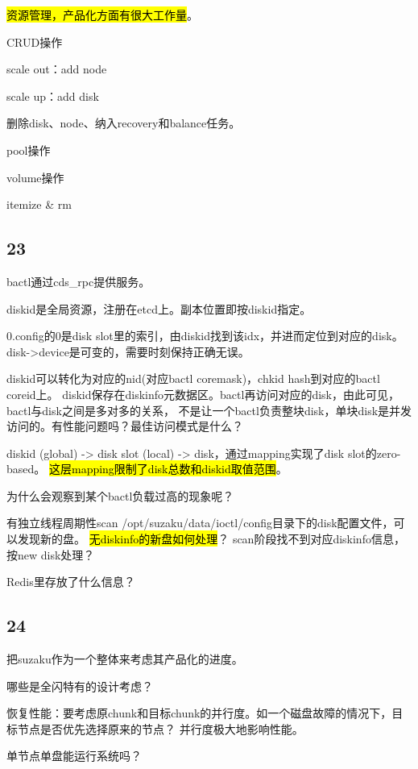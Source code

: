 \hrulefill

\hl{资源管理，产品化方面有很大工作量}。

CRUD操作

scale out：add node

scale up：add disk

删除disk、node、纳入recovery和balance任务。

pool操作

volume操作
\begin{myeasylist}{itemize}
& rm
\end{myeasylist}

\subsection{23}

bactl通过cds\_rpc提供服务。

diskid是全局资源，注册在etcd上。副本位置即按diskid指定。

0.config的0是disk slot里的索引，由diskid找到该idx，并进而定位到对应的disk。
disk->device是可变的，需要时刻保持正确无误。

diskid可以转化为对应的nid(对应bactl coremask)，chkid hash到对应的bactl coreid上。
diskid保存在diskinfo元数据区。bactl再访问对应的disk，由此可见，bactl与disk之间是多对多的关系，
不是让一个bactl负责整块disk，单块disk是并发访问的。有性能问题吗？最佳访问模式是什么？

diskid (global) -> disk slot (local) -> disk，通过mapping实现了disk slot的zero-based。
\hl{这层mapping限制了disk总数和diskid取值范围}。

为什么会观察到某个bactl负载过高的现象呢？

有独立线程周期性scan /opt/suzaku/data/ioctl/config目录下的disk配置文件，可以发现新的盘。
\hl{无diskinfo的新盘如何处理}？ scan阶段找不到对应diskinfo信息，按new disk处理？

Redis里存放了什么信息？

\subsection{24}

把suzaku作为一个整体来考虑其产品化的进度。

哪些是全闪特有的设计考虑？

恢复性能：要考虑原chunk和目标chunk的并行度。如一个磁盘故障的情况下，目标节点是否优先选择原来的节点？
并行度极大地影响性能。

单节点单盘能运行系统吗？

